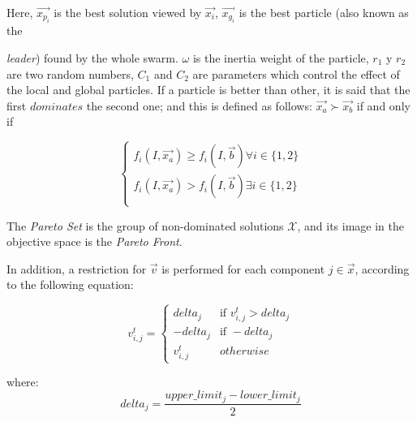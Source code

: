 \documentclass[spanish,twocolumn]{article}
\begin{document}
Here, $\overrightarrow{x_{p_i}}$ is the best solution viewed by $\overrightarrow{x_i}$, $\overrightarrow{x_{g_i}}$ is the best particle (also known as the {{\it leader}) found by the whole swarm. $\omega$ is the inertia weight of the particle, $r_1$ y $r_2$ are two random numbers, $C_1$ and $C_2$ are parameters which control the effect of the local and global particles. If a particle is better than other, it is said that the first $dominates$ the second one; and this is defined as follows: $\overrightarrow{x_{a}} \succ \overrightarrow{x_b}$ if and only if

\begin{equation}\label{eq:dominanciapareto}
         \begin{cases}  f_i(I,\overrightarrow{x_{a}})  \geq f_i(I,\overrightarrow{b}) \forall i \in \{1,2\} \\
                        f_i(I,\overrightarrow{x_{a}}) > f_i(I,\overrightarrow{b}) \exists i \in \{1,2\} \\
         \end{cases}
\end{equation}

The {\it Pareto Set} is the group of non-dominated solutions $\mathscr{X}$, and its image in the objective space is the  {\it Pareto Front}.

In addition, a restriction for $\overrightarrow{v}$ is performed for each component $j \in \overrightarrow{x}$, according to the following equation:
               
\begin{equation}\label{eq:restricciondelta}
    v_{i,j}^t = \begin{cases}  delta_j &\mbox{if } v_{i,j}^t > delta_j \\
                                -delta_j & \mbox{if } -delta_j \\
                                v_{i,j}^t & otherwise \end{cases}
\end{equation}

where: 
\begin{equation} \label{eq:restricciondelta2}
delta_j= \frac{upper\_limit_j - lower\_limit_j}{2}
\end{equation}

}
\end{document}
